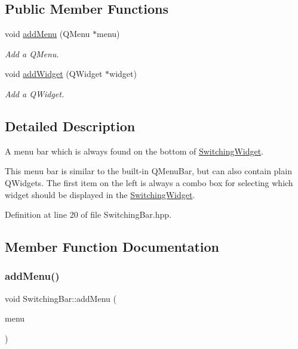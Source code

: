 \subsection*{Public Member Functions}
\begin{DoxyCompactItemize}
\item 
void \hyperlink{class_switching_bar_ad92ca7f8533cb2a9993b30b49126a2b4}{add\+Menu} (Q\+Menu $\ast$menu)
\begin{DoxyCompactList}\small\item\em Add a Q\+Menu. \end{DoxyCompactList}\item 
void \hyperlink{class_switching_bar_a8e30709aa4ada4364acf8b755f8eefb6}{add\+Widget} (Q\+Widget $\ast$widget)
\begin{DoxyCompactList}\small\item\em Add a Q\+Widget. \end{DoxyCompactList}\end{DoxyCompactItemize}


\subsection{Detailed Description}
A menu bar which is always found on the bottom of \hyperlink{class_switching_widget}{Switching\+Widget}. 

This menu bar is similar to the built-\/in Q\+Menu\+Bar, but can also contain plain Q\+Widgets. The first item on the left is always a combo box for selecting which widget should be displayed in the \hyperlink{class_switching_widget}{Switching\+Widget}. 

Definition at line 20 of file Switching\+Bar.\+hpp.



\subsection{Member Function Documentation}
\hypertarget{class_switching_bar_ad92ca7f8533cb2a9993b30b49126a2b4}{}\label{class_switching_bar_ad92ca7f8533cb2a9993b30b49126a2b4} 
\subsubsection{\texorpdfstring{add\+Menu()}{addMenu()}}
{\footnotesize\ttfamily void Switching\+Bar\+::add\+Menu (\begin{DoxyParamCaption}\item[{Q\+Menu $\ast$}]{menu }\end{DoxyParamCaption})}



